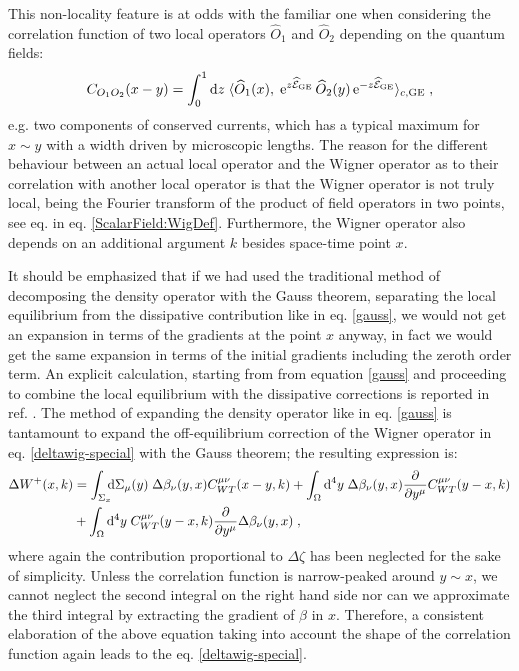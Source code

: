 \documentclass[prd,superscriptaddress,nofootinbib,notitlepage]{revtex4-1}
\def\wE{{\widehat{\cal E}}}
\def\wO{\widehat O}
\newcommand{\e}{{\rm e}}
\newcommand{\di}{{\rm d}}
\begin{document}
This non-locality feature is at odds with the familiar one when considering the correlation function of two local operators $\wO_1$ 
and $\wO_2$ depending on the quantum fields:
%
$$
C_{O_1O_2}(x-y) = \int^1_0\di z \; \langle\wO_1(x),\;\e^{z\wE_{\rm GE}}\,\wO_2(y)\,\e^{-z\wE_{\rm GE}}
\rangle_{c,\mathrm{GE}}\;,
$$
%
e.g. two components of conserved currents, which has a typical maximum for $x \sim y$ with a width driven by 
microscopic lengths. The reason for the different behaviour between an actual local operator and the Wigner operator as to 
their correlation with another local operator is that the Wigner operator is not truly local, being the Fourier transform of the 
product of field operators in two points, see eq. in eq. \eqref{ScalarField:WigDef}. Furthermore, the Wigner operator also depends 
on an additional argument $k$ besides space-time point $x$. 

It should be emphasized that if we had used the traditional method of decomposing the density operator with the Gauss theorem, 
separating the local equilibrium from the dissipative contribution like in eq. \eqref{gauss}, we would not get an expansion in terms 
of the gradients at the point $x$ anyway, in fact we would get the same expansion in terms of the initial gradients including the 
zeroth order term. An explicit calculation, starting from from equation \eqref{gauss} and proceeding to combine the local equilibrium 
with the dissipative corrections is reported in ref. \cite{roselliphd}. The method of expanding the density operator like in 
eq. \eqref{gauss} is tantamount to expand the off-equilibrium correction of the Wigner operator in eq. \eqref{deltawig-special} with 
the Gauss theorem; the resulting expression is:
%
\begin{align*}
 \Delta W^+(x,k)&= \int_{\Sigma_x} \!\!\! \di \Sigma_{\mu}(y) \; \Delta \beta_\nu(y,x) 
 C_{WT}^{\mu\nu}(x-y,k) + 
 \int_\Omega \di^4 y \; \Delta \beta_\nu(y,x) \frac{\partial}{\partial y^\mu} C_{WT}^{\mu\nu}(y-x,k) \\
&+ \int_\Omega \di^4 y \;  C_{WT}^{\mu\nu}(y-x,k) \frac{\partial}{\partial y^\mu}\Delta \beta_\nu(y,x)\;,
\end{align*}
%
where again the contribution proportional to $\Delta \zeta$ has been neglected for the sake of simplicity. Unless the correlation
function is narrow-peaked around $y \sim x$, we cannot neglect the second integral on the right hand side nor can we approximate 
the third integral by extracting the gradient of $\beta$ in $x$. Therefore, a consistent elaboration of the above equation taking 
into account the shape of the correlation function again leads to the eq. \eqref{deltawig-special}.
\end{document}
